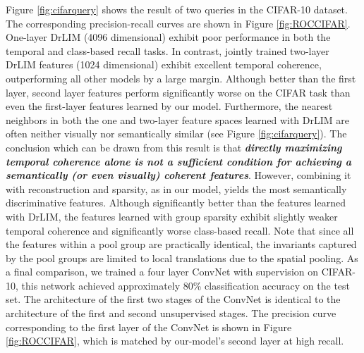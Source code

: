 \documentclass{article} %
\begin{document}
Figure \ref{fig:cifarquery} shows the result of two queries in the CIFAR-10 dataset. The corresponding precision-recall curves are shown in Figure \ref{fig:ROCCIFAR}. One-layer DrLIM (4096 dimensional) exhibit poor performance in both the temporal and class-based recall tasks. In contrast, jointly trained two-layer DrLIM features (1024 dimensional) exhibit excellent temporal coherence, outperforming all other models by a large margin. Although better than the  first layer, second layer features perform significantly worse on the CIFAR task than even the first-layer features learned by our model. Furthermore, the nearest neighbors in both the one and two-layer feature spaces learned with DrLIM are often neither visually nor semantically similar (see Figure \ref{fig:cifarquery}). The conclusion which can be drawn from this result is that \textbf{\emph{directly maximizing temporal coherence alone is not a sufficient condition for achieving a semantically (or even visually) coherent features}}. However, combining it with reconstruction and sparsity, as in our model, yields the most semantically discriminative features. Although significantly better than the features learned with DrLIM, the features learned with group sparsity exhibit slightly weaker temporal coherence and significantly worse class-based recall. Note that since all the features within a pool group are practically identical, the invariants captured by the pool groups are limited to local translations due to the spatial pooling. As a final comparison, we trained a four layer ConvNet with supervision on CIFAR-10, this network achieved approximately 80\% classification accuracy on the test set. The architecture of the first two stages of the ConvNet is identical to the architecture of the first and second unsupervised stages. The precision curve corresponding to the first layer of the ConvNet is shown in Figure \ref{fig:ROCCIFAR}, which is matched by our-model's second layer at high recall. 
\end{document}
